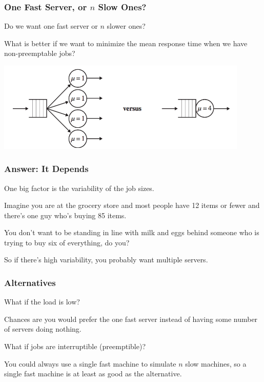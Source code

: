 \begin{frame}
\frametitle{One Fast Server, or $n$ Slow Ones?}

Do we want one fast server or $n$ slower ones? 

What is better if we want to minimize the mean response time when we have non-preemptable jobs?

\begin{center}
	\includegraphics[width=0.9\textwidth]{images/qt-example3.png}
\end{center}

\end{frame}



\begin{frame}
\frametitle{Answer: It Depends}

One big factor is the variability of the job sizes. 

Imagine you are at the grocery store and most people have 12 items or fewer and there's one guy who's buying 85 items. 

You don't want to be standing in line with milk and eggs behind someone who is trying to buy six of everything, do you? 

So if there's high variability, you probably want multiple servers.

\end{frame}



\begin{frame}
\frametitle{Alternatives}

What if the load is low? 

Chances are you would prefer the one fast server instead of having some number of servers doing nothing.

What if jobs are interruptible (preemptible)? 

You could always use a single fast machine to simulate $n$ slow machines, so a single fast machine is at least as good as the alternative. 

\end{frame}



